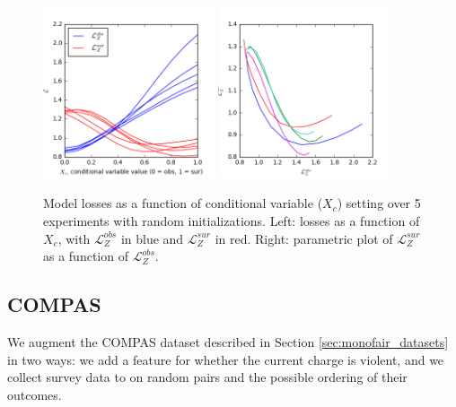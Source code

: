         \begin{figure}
            \centering
            \includegraphics[width=0.45\textwidth]{fig_softmono/synthetic_loss.png}
            \includegraphics[width=0.45\textwidth]{fig_softmono/synthetic_loss_tradeoff.png}
            \caption{
                Model losses as a function of conditional variable ($X_c$) setting over 5 experiments with random initializations.  Left: losses as a function of $X_c$, with $\mathcal{L}_Z^{obs}$ in blue and $\mathcal{L}_Z^{sur}$ in red.  Right: parametric plot of $\mathcal{L}_Z^{sur}$ as a function of $\mathcal{L}_Z^{obs}$.
            }
            \label{fig:sm_synthetic_losses}
        \end{figure}
        
    \subsection{COMPAS}
    
        We augment the COMPAS dataset described in Section \ref{sec:monofair_datasets} in two ways: we add a feature for whether the current charge is violent, and we collect survey data to on random pairs and the possible ordering of their outcomes.
        
